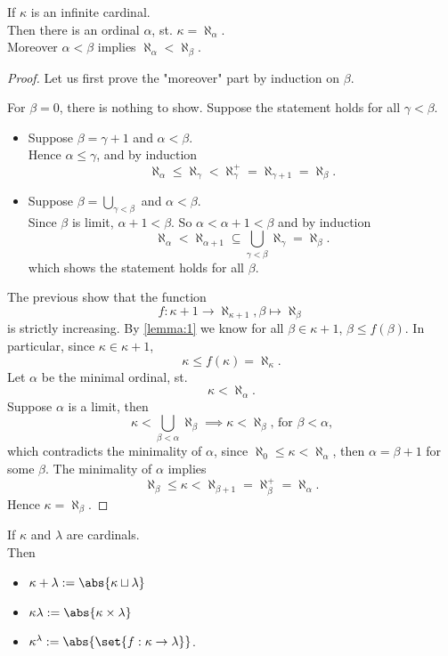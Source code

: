 \begin{proposition}
    If $\kappa$ is an infinite cardinal. \\
    Then there is an ordinal $\alpha$, st. $\kappa = \aleph_\alpha$.\\
    Moreover $\alpha< \beta$ implies $\aleph_\alpha < \aleph_\beta$.
\end{proposition}
\begin{proof}
    Let us first prove the "moreover" part by induction on $\beta$.

    For $\beta=0$, there is nothing to show. Suppose the statement holds for all $\gamma < \beta$.
    \begin{itemize}[label=-]
        \item Suppose $\beta = \gamma + 1$ and $\alpha < \beta$.\\
        Hence $\alpha \leq \gamma$, and by induction
        $$ \aleph_\alpha \leq \aleph_\gamma < \aleph_\gamma^+ = \aleph_{\gamma + 1} = \aleph_\beta.$$

        \item Suppose $\beta = \bigcup_{\gamma < \beta}$ and $\alpha < \beta$.\\
        Since $\beta$ is limit, $\alpha + 1 < \beta$. So $\alpha < \alpha + 1 < \beta$ and by induction
        $$ \aleph_\alpha < \aleph_{\alpha + 1} \subseteq \bigcup_{\gamma < \beta} \aleph_\gamma = \aleph_\beta. $$
        which shows the statement holds for all $\beta$.
    \end{itemize} 

    The previous show that the function
    $$ f: \kappa + 1 \to \aleph_{\kappa+1}, \beta \mapsto \aleph_\beta$$
    is strictly increasing. By \cref{lemma:1} we know for all $\beta \in \kappa + 1$, $\beta \leq f(\beta)$.
    In particular, since $\kappa \in \kappa + 1$,
    $$ \kappa \leq f(\kappa) = \aleph_\kappa.$$
    Let $\alpha$ be the minimal ordinal, st. 
    $$\kappa < \aleph_\alpha. $$
    Suppose $\alpha$ is a limit, then
    $$ \kappa < \bigcup_{\beta < \alpha} \aleph_\beta \implies \kappa < \aleph_\beta\text{, for $\beta < \alpha$,}$$
    which contradicts the minimality of $\alpha$, since $\aleph_0 \leq \kappa < \aleph_\alpha$, then $\alpha = \beta + 1$
    for some $\beta$. The minimality of $\alpha$ implies
    $$ \aleph_\beta \leq \kappa < \aleph_{\beta + 1} = \aleph_\beta^+ = \aleph_\alpha.$$
    Hence $\kappa = \aleph_\beta$.
\end{proof}

\begin{definition}
    If $\kappa$ and $\lambda$ are cardinals.\\
    Then \begin{itemize}
        \item $\kappa + \lambda := \abs{\kappa \sqcup \lambda}$
        \item $\kappa \lambda := \abs{\kappa \times \lambda}$
        \item $\kappa^\lambda := \abs{\set{f: \kappa \to \lambda}}$.
    \end{itemize}
\end{definition}

